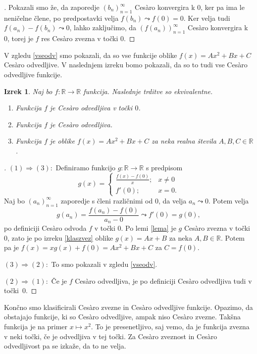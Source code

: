 \documentclass[a4paper,12pt]{article}
\theoremstyle{definition}
\theoremstyle{plain}
\newtheorem{izrek}{Izrek}
\newenvironment{dokaz}{\begin{proof}[\bfseries\upshape\proofname]}{\end{proof}}
\begin{document}
\begin{dokaz}
    Pokazali smo že, da zaporedje $(b_n)_{n=1}^{\infty}$ Ces\`{a}ro konvergira k $0$, ker pa ima le neničelne člene, po predpostavki velja $f(b_n) \leadsto f(0) = 0$. Ker velja tudi $f(a_n) - f(b_n) \leadsto 0$, lahko zaključimo, da $(f(a_n))_{n=1}^{\infty}$ Ces\`{a}ro konvergira k $0$, torej je $f$ res Ces\`{a}ro zvezna v točki $0$.
\end{dokaz}

V zgledu \ref{vseodv} smo pokazali, da so vse funkcije oblike $f(x) = Ax^2 + Bx + C$ Ces\`{a}ro odvedljive. V naslednjem izreku bomo pokazali, da so to tudi vse Ces\`{a}ro odvedljive funkcije.

\begin{izrek}
    \label{klasodv}
    Naj bo $f: \mathbb{R} \rightarrow \mathbb{R}$ funkcija. Naslednje trditve so ekvivalentne.
    \begin{enumerate}
        \item Funkcija $f$ je Ces\`{a}ro odvedljiva v točki $0$.
        \item Funkcija $f$ je Ces\`{a}ro odvedljiva.
        \item Funkcija $f$ je oblike $f(x) = Ax^2 + Bx + C$ za neka realna števila $A, B, C \in \mathbb{R}$.
    \end{enumerate}
\end{izrek}
\begin{dokaz}
    $(1) \Rightarrow (3): $ Definiramo funkcijo $g: \mathbb{R} \rightarrow \mathbb{R}$ s predpisom 
    $$
    g(x) = \begin{cases}
        \frac{f(x)-f(0)}{x}; & x \neq 0\\
        f'(0); & x = 0.
    \end{cases}
    $$
    Naj bo $(a_n)_{n=1}^{\infty}$ zaporedje s členi različnimi od $0$, da velja $a_n \leadsto 0$. Potem velja 
    $$g(a_n) = \frac{f(a_n)-f(0)}{a_n-0} \leadsto f'(0) = g(0),$$
    po definiciji Ces\`{a}ro odvoda $f$ v točki $0$. Po lemi \ref{lema} je $g$ Ces\`{a}ro zvezna v točki $0$, zato je po izreku \ref{klaszvez} oblike $g(x) = Ax + B$ za neka $A, B \in \mathbb{R}$. Potem pa je 
    $f(x) = xg(x) + f(0) = Ax^2 + Bx + C$ za $C = f(0)$.

    $(3) \Rightarrow (2): $ To smo pokazali v zgledu \ref{vseodv}.

    $(2) \Rightarrow (1): $ Če je $f$ Ces\`{a}ro odvedljiva, je po definiciji Ces\`{a}ro odvedljiva tudi v točki~$0$.
\end{dokaz}

Končno smo klasificirali Ces\`{a}ro zvezne in Ces\`{a}ro odvedljive funkcije. Opazimo, da obstajajo funkcije, ki so Ces\`{a}ro odvedljive, ampak niso Ces\`{a}ro zvezne. Takšna funkcija je na primer $x \mapsto x^2$. To je presenetljivo, saj vemo, da je funkcija zvezna v neki točki, če je odvedljiva v tej točki. Za Ces\`{a}ro zveznost in Ces\`{a}ro odvedljivost pa se izkaže, da to ne velja.
\end{document}
